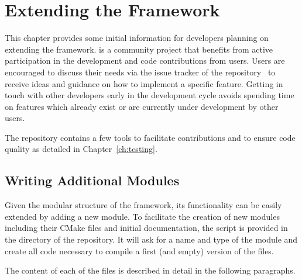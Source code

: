\chapter{Extending the \corry Framework}

This chapter provides some initial information for developers planning on extending the \corry framework.
\corry is a community project that benefits from active participation in the development and code contributions from users.
Users are encouraged to discuss their needs via the issue tracker of the repository~\cite{corry-issue-tracker} to receive ideas and guidance on how to implement a specific feature.
Getting in touch with other developers early in the development cycle avoids spending time on features which already exist or are currently under development by other users.

The repository contains a few tools to facilitate contributions and to ensure code quality as detailed in Chapter~\ref{ch:testing}.

\section{Writing Additional Modules}

Given the modular structure of the framework, its functionality can be easily extended by adding a new module.
To facilitate the creation of new modules including their CMake files and initial documentation, the script  is provided in the  directory of the repository.
It will ask for a name and type of the module and create all code necessary to compile a first (and empty) version of the files.

The content of each of the files is described in detail in the following paragraphs.

